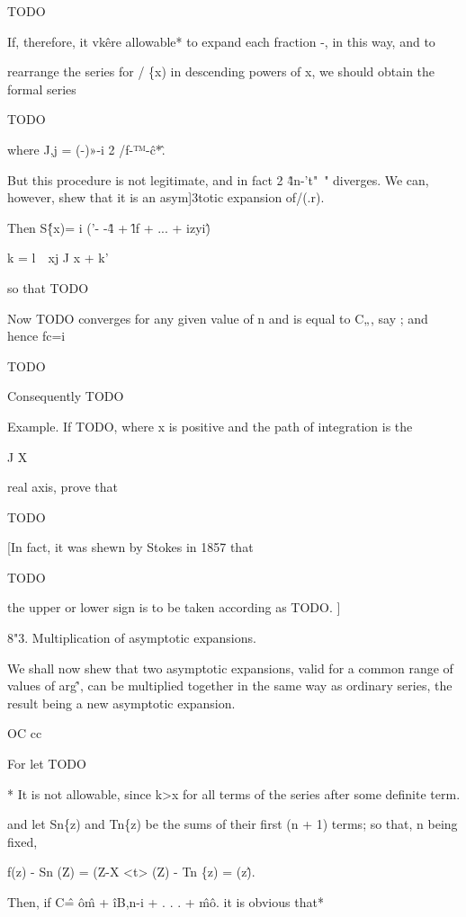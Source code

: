 TODO

If, therefore, it vk\^ere allowable* to expand each fraction -, in this way, and to 

rearrange the series for / \{x) in descending powers of x, we should obtain the formal series 

TODO

where J,j = (-)»-i 2 /f-™-\^c*\^. 

But this procedure is not legitimate, and in fact 2 \^4n-'t"~" diverges. We can, however, 
shew that it is an asym]3totic expansion of/(.r). 



Then S\^\{x)= i ('- -\^4 + \^lf + ... + izyi\^) 



k = l\ \ xj J x + k' 



so that TODO

Now TODO converges for any given value of n and is equal to C„, say ; and hence 
fc=i 

TODO

Consequently TODO

Example. If TODO, where x is positive and the path of integration is the 

J X 

real axis, prove that 

TODO

[In fact, it was shewn by Stokes in 1857 that 

TODO

the upper or lower sign is to be taken according as TODO. ] 

8"3. Multiplication of asymptotic expansions. 

We shall now shew that two asymptotic expansions, valid for a common 
range of values of arg\^', can be multiplied together in the same way as 
ordinary series, the result being a new asymptotic expansion. 

OC cc 

For let TODO

* It is not allowable, since k>x for all terms of the series after some definite term. 

%
%
and let Sn\{z) and Tn\{z) be the sums of their first (n + 1) terms; so that, 
n being fixed, 

f(z) - Sn (Z) = (Z-X <t> (Z) - Tn \{z) = (z\^). 

Then, if C\^ = \^o\^m + \^iB,n-i + . . . + \^m\^o. it is obvious that* 

